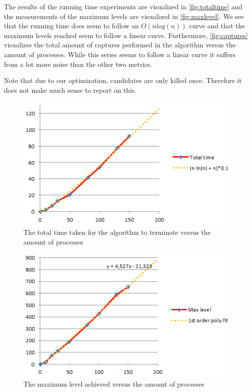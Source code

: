 \documentclass[12pt]{article}
\begin{document}
\quad The results of the running time experiments are visualized in \autoref{fig:totaltime} and the measurements of the
maximum levels are visualized in \autoref{fig:maxlevel}. We see that the running time does seem to follow an $O(n log(n))$ curve
and that the maximum levels reached seem to follow a linear curve.
Furthermore, \autoref{fig:captures} visualizes the total amount of captures performed in the algorithm versus the amount of
processes. While this series seems to follow a linear curve it suffers from a lot more noise than the other two metrics.

\quad Note that due to our optimization, candidates are only killed once. Therefore it does not make much sense to report on this.

\begin{figure}[p]
    \centering
    \includegraphics{totaltime.png}
    \caption{The total time taken for the algorithm to terminate versus the amount of processes}
    \label{fig:totaltime}
\end{figure}

\begin{figure}[p]
    \centering
    \includegraphics{maxlevel.png}
    \caption{The maximum level achieved versus the amount of processes}
    \label{fig:maxlevel}
\end{figure}
\end{document}
